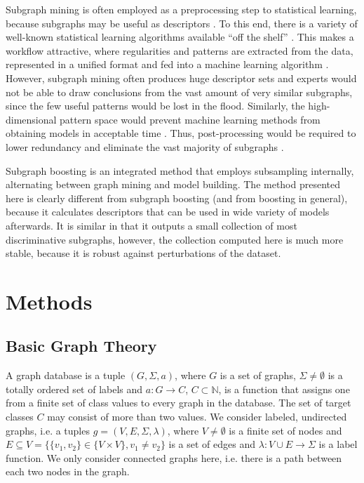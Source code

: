 \documentclass{article}
\begin{document}
Subgraph mining is often employed as a preprocessing step to statistical
learning, because subgraphs may be useful as descriptors
\cite{bringmann10lego,schietgat09mcsfeatures}. To this end, there is a variety
of well-known statistical learning algorithms available ``off the shelf''
\cite{hall09weka,r08language}. This makes a workflow attractive, where
regularities and patterns are extracted from the data, represented in a unified
format and fed into a machine learning algorithm \cite{hkr03molfea}.  However,
subgraph mining often produces huge descriptor sets and experts would not be
able to draw conclusions from the vast amount of very similar subgraphs, since
the few useful patterns would be lost in the flood.  Similarly, the
high-dimensional pattern space would prevent machine learning methods from
obtaining models in acceptable time \cite{Hasan_origami:mining}.  Thus,
post-processing would be required to lower redundancy and eliminate the vast
majority of subgraphs \cite{schietgat09mcsfeatures, CMNK01Frequent, Jun04Spin}. 

Subgraph boosting \cite{saigo09gboost} is an integrated method that employs
subsampling internally, alternating between graph mining and model building.
The method presented here is clearly different from subgraph boosting (and from
boosting in general), because it calculates descriptors that can be used in
wide variety of models afterwards. It is similar in that it outputs a small
collection of most discriminative subgraphs, however, the collection computed
here is much more stable, because it is robust against perturbations of the
dataset.



\section{Methods}
\label{s:Methods}

\subsection{Basic Graph Theory}
\label{ss:BasicGraphTheory}
A graph database is a tuple $(G, \Sigma, a)$, where $G$ is a set of graphs,
$\Sigma \ne \emptyset$  is a totally ordered set of labels and $a: G
\rightarrow C$, $C \subset \mathbb{N}$, is a function that assigns one from a
finite set of class values to every graph in the database.  The set of target
classes $C$ may consist of more than two values.  We consider labeled,
undirected graphs, i.e. a tuples $g=(V,E,\Sigma,\lambda)$, where $V\ne
\emptyset$ is a finite set of nodes and $E \subseteq V = \{\{v_1, v_2\} \in \{V
\times V\}, v_1 \ne v_2\}$ is a set of edges and $\lambda: V\cup E \rightarrow
\Sigma$ is a label function.  We only consider connected graphs here, i.e.
there is a path between each two nodes in the graph.
\end{document}
